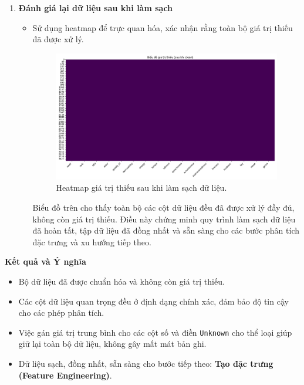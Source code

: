 \begin{enumerate}[label=\arabic*]
    \item \textbf{Đánh giá lại dữ liệu sau khi làm sạch}
    \begin{itemize}
        \item Sử dụng heatmap để trực quan hóa, xác nhận rằng toàn bộ giá trị thiếu đã được xử lý.
        \begin{figure}[H] %
            \centering
            \includegraphics[width=1.0\textwidth]{../graphics/data3/Output/step2/missing_values_after_clean.png}
            \caption{Heatmap giá trị thiếu sau khi làm sạch dữ liệu.}
            \label{fig:missing}
        \end{figure}
        Biểu đồ trên cho thấy toàn bộ các cột dữ liệu đều đã được xử lý đầy đủ, 
    không còn giá trị thiếu. Điều này chứng minh quy trình làm sạch dữ liệu đã hoàn tất, tập dữ liệu đã đồng nhất và sẵn sàng cho các bước phân tích đặc trưng và xu hướng tiếp theo.

    \end{itemize}
\end{enumerate}

\textbf{Kết quả và Ý nghĩa} 

\begin{itemize}
    \item Bộ dữ liệu đã được chuẩn hóa và không còn giá trị thiếu.
    \item Các cột dữ liệu quan trọng đều ở định dạng chính xác, đảm bảo độ tin cậy cho các phép phân tích.
    \item Việc gán giá trị trung bình cho các cột số và điền \texttt{Unknown} cho thể loại 
    giúp giữ lại toàn bộ dữ liệu, không gây mất mát bản ghi.
    \item Dữ liệu sạch, đồng nhất, sẵn sàng cho bước tiếp theo: \textbf{Tạo đặc trưng (Feature Engineering)}.
\end{itemize}

